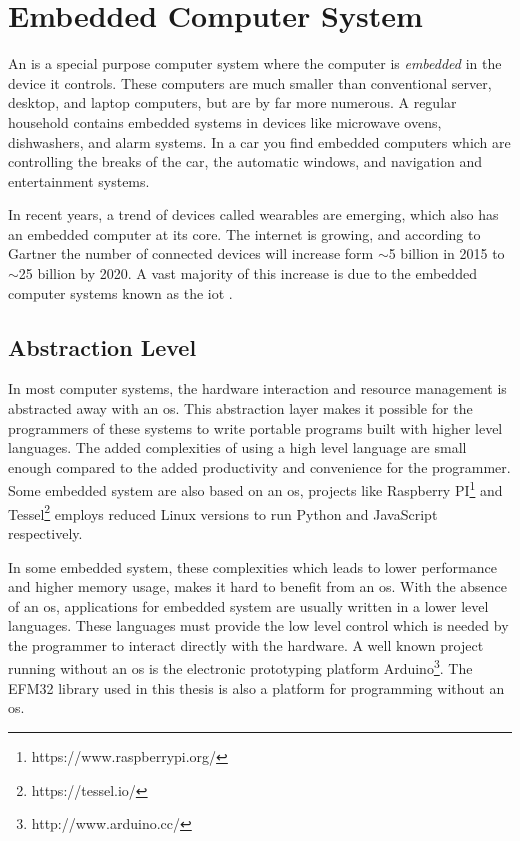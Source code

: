 \section{Embedded Computer System}
An  is a special purpose computer system where the computer is \emph{embedded} in the device it controls.
These computers are much smaller than conventional server, desktop, and laptop computers, but are by far more numerous.
A regular household contains embedded systems in devices like microwave ovens, dishwashers, and alarm systems.
In a car you find embedded computers which are controlling the breaks of the car, the automatic windows, and navigation and entertainment systems.

In recent years, a trend of devices called wearables are emerging, which also has an embedded computer at its core.
The internet is growing, and according to Gartner \cite{web:gartner} the number of connected devices will increase form $\sim$5 billion in 2015 to $\sim$25 billion by 2020.
A vast majority of this increase is due to the embedded computer systems known as the \gls{iot} \cite{Valhouli2010}.

\subsection{Abstraction Level}
In most computer systems, the hardware interaction and resource management is abstracted away with an \gls{os}.
This abstraction layer makes it possible for the programmers of these systems to write portable programs built with higher level languages.
The added complexities of using a high level language are small enough compared to the added productivity and convenience for the programmer.
Some embedded system are also based on an \gls{os}, projects like Raspberry PI\footnote{https://www.raspberrypi.org/} and Tessel\footnote{https://tessel.io/} employs reduced Linux versions to run Python and JavaScript respectively.

In some embedded system, these complexities which leads to lower performance and higher memory usage, makes it hard to benefit from an \gls{os}.
With the absence of an \gls{os}, applications for embedded system are usually written in a lower level languages.
These languages must provide the low level control which is needed by the programmer to interact directly with the hardware.
A well known project running without an \gls{os} is the electronic prototyping platform Arduino\footnote{http://www.arduino.cc/}.
The EFM32 {\emlib} library used in this thesis is also a platform for {\C} programming without an \gls{os}.

